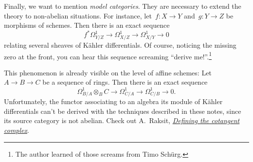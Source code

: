 \documentclass{amsart}
\theoremstyle{definition}
\theoremstyle{plain}
\theoremstyle{remark}
\newcommand{\?}{\,{:}\,}
\renewcommand{\_}{\mathpunct{.}\,}
\newcommand{\lra}{\longrightarrow}
\begin{document}
Finally, we want to mention \emph{model categories}. They are necessary to
extend the theory to non-abelian situations. For instance, let~$f : X \to Y$
and~$g : Y \to Z$ be morphisms of schemes. Then there is an exact sequence
\[ f^* \Omega^1_{Y/Z} \lra \Omega^1_{X/Z} \lra \Omega^1_{X/Y} \lra 0 \]
relating several sheaves of Kähler differentials. Of course, noticing the
missing zero at the front, you can hear this sequence screaming ``derive
me!''.\footnote{The author learned of those screams from Timo Schürg.}

This phenomenon is already visible on the level of affine schemes: Let~$A \to B
\to C$ be a sequence of rings. Then there is an exact sequence
\[ \Omega^1_{B/A} \otimes_B C \lra \Omega^1_{C/A} \lra \Omega^1_{C/B} \lra 0.
\]
Unfortunately, the functor associating to an algebra its module of Kähler
differentials can't be derived with the techniques described in these notes,
since its source category is not abelian. Check out A.~Raksit,
\href{http://www.arponr.com/files/quillen-cotangent.pdf}{\emph{Defining the
cotangent complex}}.
\end{document}
